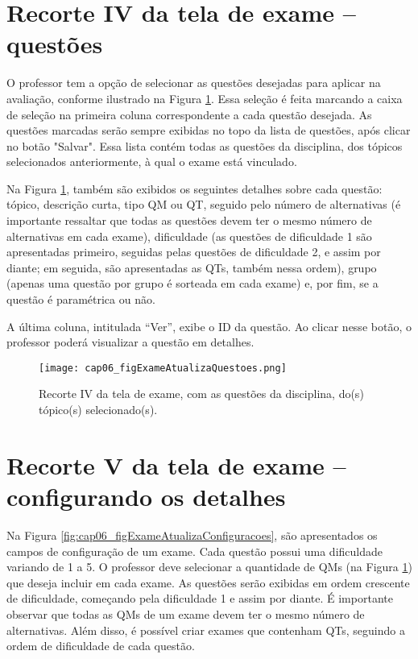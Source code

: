 \section{Recorte IV da tela de exame -- questões}

O professor tem a opção de selecionar as questões desejadas para aplicar na avaliação, conforme ilustrado na Figura \ref{fig:cap06_figExameAtualizaQuestoes}. Essa seleção é feita marcando a caixa de seleção na primeira coluna correspondente a cada questão desejada. As questões marcadas serão sempre exibidas no topo da lista de questões, após clicar no botão "Salvar". Essa lista contém todas as questões da disciplina, dos tópicos selecionados anteriormente, à qual o exame está vinculado.

Na Figura \ref{fig:cap06_figExameAtualizaQuestoes}, também são exibidos os seguintes detalhes sobre cada questão: tópico, descrição curta, tipo QM ou QT, seguido pelo número de alternativas (é importante ressaltar que todas as questões devem ter o mesmo número de alternativas em cada exame), dificuldade (as questões de dificuldade 1 são apresentadas primeiro, seguidas pelas questões de dificuldade 2, e assim por diante; em seguida, são apresentadas as QTs, também nessa ordem), grupo (apenas uma questão por grupo é sorteada em cada exame) e, por fim, se a questão é paramétrica ou não.

A última coluna, intitulada ``Ver'', exibe o ID da questão. Ao clicar nesse botão, o professor poderá visualizar a questão em detalhes.

\begin{figure}[!t]
  \centering
  \texttt{[image: cap06\_figExameAtualizaQuestoes.png]}
  \caption{Recorte IV da tela de exame, com as questões da disciplina, do(s) tópico(s) selecionado(s).}
  \label{fig:cap06_figExameAtualizaQuestoes}\vspace{-3mm}
\end{figure}

\section{Recorte V da tela de exame -- configurando os detalhes}\label{sec:exameDetalhes}

Na Figura \ref{fig:cap06_figExameAtualizaConfiguracoes}, são apresentados os campos de configuração de um exame. Cada questão possui uma dificuldade variando de 1 a 5. O professor deve selecionar a quantidade de QMs (na Figura \ref{fig:cap06_figExameAtualizaQuestoes}) que deseja incluir em cada exame. As questões serão exibidas em ordem crescente de dificuldade, começando pela dificuldade 1 e assim por diante. É importante observar que todas as QMs de um exame devem ter o mesmo número de alternativas. Além disso, é possível criar exames que contenham QTs, seguindo a ordem de dificuldade de cada questão.

